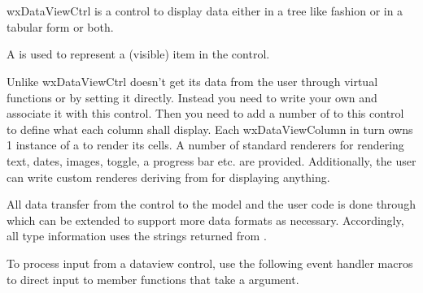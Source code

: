 
\section{}\label{wxdataviewctrl}

wxDataViewCtrl is a control to display data either
in a tree like fashion or in a tabular form or both. 

A  is used
to represent a (visible) item in the control.

Unlike  wxDataViewCtrl doesn't 
get its data from the user through virtual functions or by
setting it directly. Instead you need to write your own 
 and associate
it with this control. Then you need to add a number of
 to this control to
define what each column shall display. Each wxDataViewColumn
in turn owns 1 instance of a 
 to render its
cells. A number of standard renderers for rendering text, dates,
images, toggle, a progress bar etc. are provided. Additionally,
the user can write custom renderes deriving from 
for displaying anything.

All data transfer from the control to the model and the user
code is done through  which can
be extended to support more data formats as necessary. 
Accordingly, all type information uses the strings returned
from .


\twocolwidtha{5cm}
\begin{twocollist}\itemsep=0pt
\end{twocollist}



To process input from a dataview control, use the following event handler
macros to direct input to member functions that take a 
 argument.

